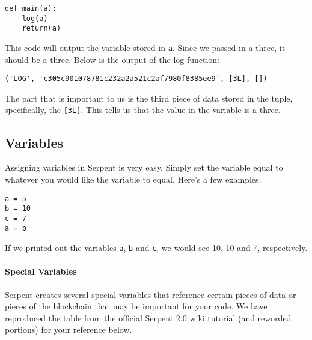 \documentclass[12pt]{article}
\begin{document}
\begin{verbatim}
def main(a):
	log(a)
	return(a)
\end{verbatim}
This code will output the variable stored in \texttt{a}. Since we passed in a three, it should be a three. Below is the output of the log function:

\begin{verbatim}
('LOG', 'c305c901078781c232a2a521c2af7980f8385ee9', [3L], [])
\end{verbatim}

The part that is important to us is the third piece of data stored in the tuple, specifically, the \texttt{[3L]}. This tells us that the value in the variable is a three.

\subsection{Variables}

Assigning variables in Serpent is very easy. Simply set the variable equal to whatever you would like the variable to equal. Here's a few examples:

\begin{verbatim}
a = 5
b = 10
c = 7
a = b
\end{verbatim}

If we printed out the variables \texttt{a}, \texttt{b} and \texttt{c}, we would see 10, 10 and 7, respectively. 

\paragraph{Special Variables}

Serpent creates several special variables that reference certain pieces of data or pieces of the blockchain that may be important for your code. We have reproduced the table from the official Serpent 2.0 wiki tutorial (and reworded portions) for your reference below. \cite{Serpent}
\end{document}
